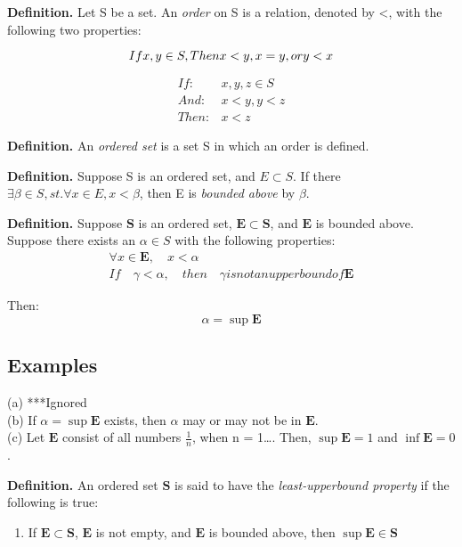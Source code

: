 \documentclass{article}
\begin{document}
{\bf Definition.} Let S be a set. An \emph{order} on S is a relation, denoted by <, with the following two properties:

\begin{equation}
	If x,y \in S, \\
	Then x < y, x = y, or y < x
\end{equation}

\begin{align*}
	If: 		&	x, y, z \in S \\
	And:		& x < y, y < z \\
	Then:		&	x < z
\end{align*}

{\bf Definition.} An \emph{ordered set} is a set S in which an order is defined.

{\bf Definition.}
	Suppose S is an ordered set, and $ E \subset S $.
	If there $ \exists \beta \in S, st. \forall x \in E, x < \beta $, then E is \emph{bounded above} by $\beta$.
	
{\bf Definition.}
	Suppose $\mathbf{S}$ is an ordered set, $\mathbf{E} \subset \mathbf{S}$, and $\mathbf{E}$ is bounded above. Suppose there exists an $\alpha \in S$ with the following properties:
	\begin{gather*}
		\forall x \in \mathbf{E}, \quad x < \alpha \\
		If \quad \gamma < \alpha, \quad then \quad \gamma is not an upper bound of \mathbf{E}
	\end{gather*}
	
	Then:
		$$ \alpha = \sup \mathbf{E} $$
		
\subsection{Examples}
	(a) ***Ignored \\
	(b) If $\alpha = \sup \mathbf{E}$ exists, then $\alpha$ may or may not be in $\mathbf{E}$. \\
	(c) Let $\mathbf{E}$ consist of all numbers $\frac{1}{n}$, when n = 1\dots. Then, $\sup\mathbf{E} = 1$ and $\inf\mathbf{E} = 0$.
	
{\bf Definition.} An ordered set $\mathbf{S}$ is said to have the \emph{least-upperbound property} if the following is true: \\

\begin{enumerate}
	\item
		If $\mathbf{E} \subset \mathbf{S}$, $\mathbf{E}$ is not empty, and $\mathbf{E}$ is bounded above,
		then $\sup\mathbf{E} \in \mathbf{S}$
\end{enumerate}
\end{document}
